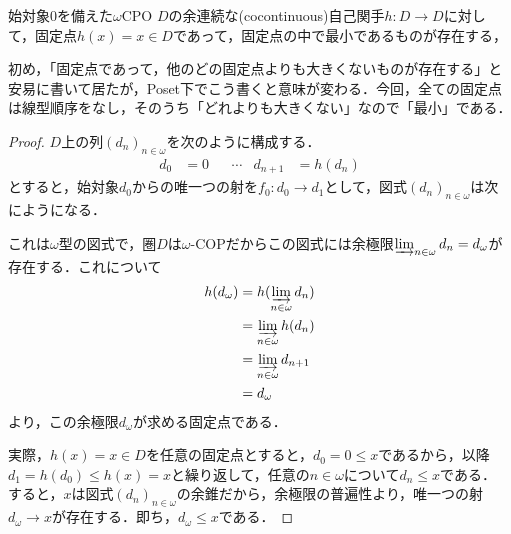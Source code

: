 \documentclass[uplatex, 12pt, dvipdfmx]{jsarticle}
\begin{document}
\begin{proposition}
    始対象$0$を備えた$\omega$CPO $D$の余連続な(cocontinuous)自己関手$h:D\to D$に対して，固定点$h(x)=x\in D$であって，固定点の中で最小であるものが存在する，
\end{proposition}
\begin{remark*}
    初め，「固定点であって，他のどの固定点よりも大きくないものが存在する」と安易に書いて居たが，Poset下でこう書くと意味が変わる．今回，全ての固定点は線型順序をなし，そのうち「どれよりも大きくない」なので「最小」である．
\end{remark*}
\begin{proof}
    $D$上の列$(d_n)_{n\in\omega}$を次のように構成する．
    \begin{align*}
        d_0 &= 0 & &\cdots& d_{n+1}&= h(d_n)
    \end{align*}
    とすると，始対象$d_0$からの唯一つの射を$f_0:d_0\to d_1$として，図式$(d_n)_{n\in\omega}$は次にようになる．
    \begin{center}
    \end{center}
    これは$\omega$型の図式で，圏$D$は$\omega$-COPだからこの図式には余極限$\varinjlim_{n\in\omega}d_n=d_\omega$が存在する．これについて
    \begin{align*}
        h(d_\omega) &= h(\varinjlim_{n\in\omega}d_n) \\
        &= \varinjlim_{n\in\omega}h(d_n) \\
        &= \varinjlim_{n\in\omega}d_{n+1} \\
        &=d_\omega
    \end{align*}
    より，この余極限$d_\omega$が求める固定点である．

    実際，$h(x)=x\in D$を任意の固定点とすると，$d_0=0\le x$であるから，以降$d_1=h(d_0)\le h(x)=x$と繰り返して，任意の$n\in\omega$について$d_n\le x$である．
    すると，$x$は図式$(d_n)_{n\in\omega}$の余錐だから，余極限の普遍性より，唯一つの射$d_\omega\to x$が存在する．即ち，$d_\omega\le x$である．
\end{proof}
\end{document}
